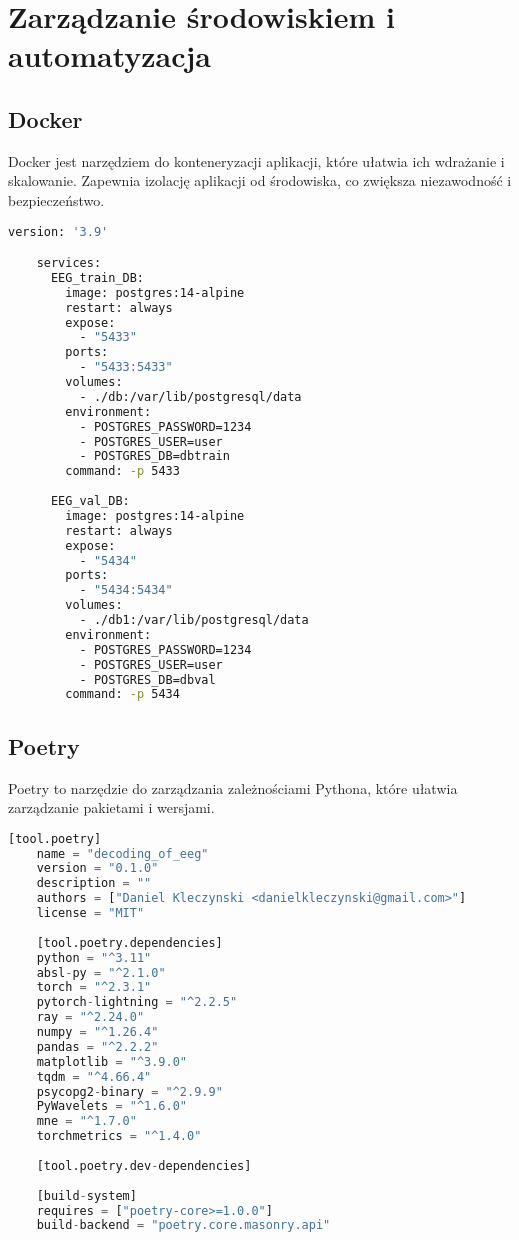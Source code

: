 \documentclass[12pt,twoside]{article}
\begin{document}
\section{Zarządzanie środowiskiem i automatyzacja}

\subsection{Docker}
Docker jest narzędziem do konteneryzacji aplikacji, które ułatwia ich wdrażanie i skalowanie. Zapewnia izolację aplikacji od środowiska, co zwiększa niezawodność i bezpieczeństwo.

\begin{lstlisting}[language=bash,caption={Docker Compose configuration},label={lst:dockercompose}]
	version: '3.9'

	services:
	  EEG_train_DB:
		image: postgres:14-alpine
		restart: always
		expose:
		  - "5433"
		ports:
		  - "5433:5433"
		volumes:
		  - ./db:/var/lib/postgresql/data
		environment:
		  - POSTGRES_PASSWORD=1234
		  - POSTGRES_USER=user
		  - POSTGRES_DB=dbtrain
		command: -p 5433
	
	  EEG_val_DB:
		image: postgres:14-alpine
		restart: always
		expose:
		  - "5434"
		ports:
		  - "5434:5434"
		volumes:
		  - ./db1:/var/lib/postgresql/data
		environment:
		  - POSTGRES_PASSWORD=1234
		  - POSTGRES_USER=user
		  - POSTGRES_DB=dbval
		command: -p 5434
\end{lstlisting}

\subsection{Poetry}
Poetry to narzędzie do zarządzania zależnościami Pythona, które ułatwia zarządzanie pakietami i wersjami.


\begin{lstlisting}[language=Python,caption={Poetry configuration},label={lst:poetrytoml}]
	[tool.poetry]
	name = "decoding_of_eeg"
	version = "0.1.0"
	description = ""
	authors = ["Daniel Kleczynski <danielkleczynski@gmail.com>"]
	license = "MIT"
	
	[tool.poetry.dependencies]
	python = "^3.11"
	absl-py = "^2.1.0"
	torch = "^2.3.1"
	pytorch-lightning = "^2.2.5"
	ray = "^2.24.0"
	numpy = "^1.26.4"
	pandas = "^2.2.2"
	matplotlib = "^3.9.0"
	tqdm = "^4.66.4"
	psycopg2-binary = "^2.9.9"
	PyWavelets = "^1.6.0"
	mne = "^1.7.0"
	torchmetrics = "^1.4.0"
	
	[tool.poetry.dev-dependencies]
	
	[build-system]
	requires = ["poetry-core>=1.0.0"]
	build-backend = "poetry.core.masonry.api"
	
\end{lstlisting}
\end{document}
